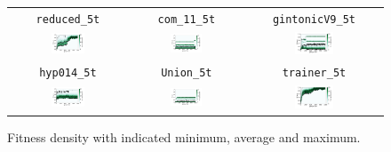 \documentclass[11pt,a4paper]{scrartcl}
\begin{document}
\begin{figure}[H]
\center
\begin{tabular}{ccc}
\texttt{reduced\_5t} & \texttt{com\_11\_5t} & \texttt{gintonicV9\_5t} \\
\includegraphics[width=0.3\textwidth]{img/self_adapt_1_reduced_5t.png} &
\includegraphics[width=0.3\textwidth]{img/self_adapt_1_com_11_5t.png} &
\includegraphics[width=0.3\textwidth]{img/self_adapt_1_gintonicV9_5t.png} \\
\texttt{hyp014\_5t} & \texttt{Union\_5t} & \texttt{trainer\_5t} \\
\includegraphics[width=0.3\textwidth]{img/self_adapt_1_hyp014_5t.png} &
\includegraphics[width=0.3\textwidth]{img/self_adapt_1_Union_5t.png} &
\includegraphics[width=0.3\textwidth]{img/self_adapt_1_trainer_5t.png}
\end{tabular}
\caption{Fitness density with indicated minimum, average and maximum.}
\label{fig:self_adapt_1_5t}
\end{figure}
\end{document}
